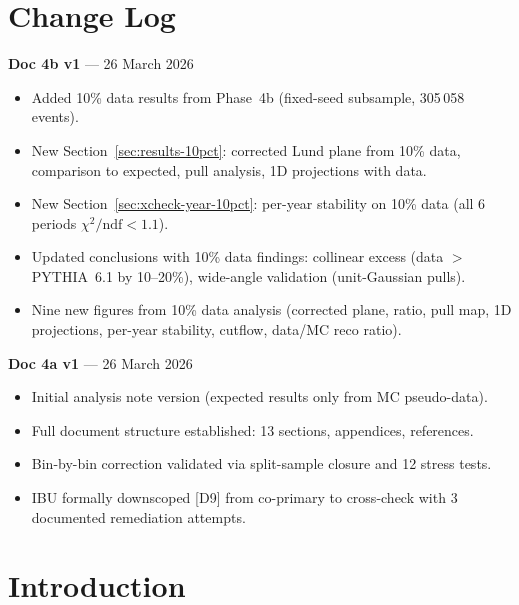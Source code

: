 \documentclass[11pt,a4paper]{article}
\begin{document}
\tableofcontents
\clearpage

\section*{Change Log}

\textbf{Doc 4b v1} --- 26 March 2026
\begin{itemize}
\item Added 10\% data results from Phase~4b (fixed-seed subsample, 305\,058 events).
\item New Section~\ref{sec:results-10pct}: corrected Lund plane from 10\% data, comparison to expected, pull analysis, 1D projections with data.
\item New Section~\ref{sec:xcheck-year-10pct}: per-year stability on 10\% data (all 6 periods $\chi^2/\text{ndf} < 1.1$).
\item Updated conclusions with 10\% data findings: collinear excess (data $>$ PYTHIA~6.1 by 10--20\%), wide-angle validation (unit-Gaussian pulls).
\item Nine new figures from 10\% data analysis (corrected plane, ratio, pull map, 1D projections, per-year stability, cutflow, data/MC reco ratio).
\end{itemize}

\medskip

\textbf{Doc 4a v1} --- 26 March 2026
\begin{itemize}
\item Initial analysis note version (expected results only from MC pseudo-data).
\item Full document structure established: 13 sections, appendices, references.
\item Bin-by-bin correction validated via split-sample closure and 12 stress tests.
\item IBU formally downscoped [D9] from co-primary to cross-check with 3 documented remediation attempts.
\end{itemize}

\clearpage

\section{Introduction}
\label{sec:intro}
\end{document}
